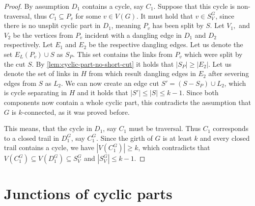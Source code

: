 \documentclass[12pt, twoside]{book}
\begin{document}
\begin{proof}
	By assumption $D_1$ contains a cycle, say $C_1$. Suppose that this cycle is non-traversal, thus $C_1\subseteq P_v$ for some $v\in V(G)$. It must hold that $v\in S_V^G$, since there is no unsplit cyclic part in $D_1$, meaning $P_v$ has been split by $S$. Let $V_1,$ and $V_2$ be the vertices from $P_v$ incident with a dangling edge in $D_1$ and $D_2$ respectively. Let $E_1$ and $E_2$ be the respective dangling edges. Let us denote the set $E_L(P_v)\cup S$ as $S_P$. This set contains the links from $P_v$ which were split by the cut $S$. By \cref{lem:cyclic-part-no-short-cut} it holds that $|S_P|\geq|E_2|$. Let us denote the set of links in $H$ from which result dangling edges in $E_2$ after severing edges from $S$ as $L_2$. We can now create an edge cut $S'=(S-S_P)\cup L_2$, which is cycle separating in $H$ and it holds that $|S'|\leq |S|\leq k-1$. Since both components now contain a whole cyclic part, this contradicts the assumption that $G$ is $k$-connected, as it was proved before.
	
	This means, that the cycle in $D_1$, say $C_1$ must be traversal. Thus $C_1$ corresponds to a closed trail in $D_1^G$, say $C_1^G$. Since the girth of $G$ is at least $k$ and every closed trail contains a cycle, we have $|V(C_1^G)|\geq k$, which contradicts that $V(C_1^G)\subseteq V(D_1^G)\subseteq S_V^G$ and $|S_V^G|\leq k-1$.
	
\end{proof}

\section{Junctions of cyclic parts}\label{sec:cyclic-part-junctions}

\newpage
\thispagestyle{empty}




\end{document}
